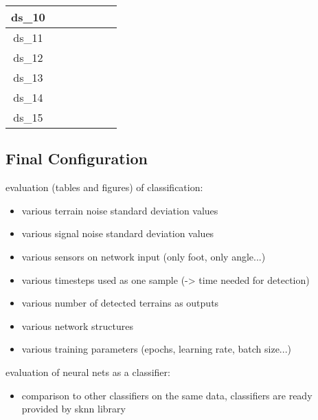 \begin{table}[H]
\begin{tabular}{|c|c|c|c|c|c|c|}
ds\_10                            &                   &                    &                 &                   &                    &                 \\ \hline
ds\_11                            &                   &                    &                 &                   &                    &                 \\ \hline
ds\_12                            &                   &                    &                 &                   &                    &                 \\ \hline
ds\_13                            &                   &                    &                 &                   &                    &                 \\ \hline
ds\_14                            &                   &                    &                 &                   &                    &                 \\ \hline
ds\_15                            &                   &                    &                 &                   &                    &                 \\ \hline
\end{tabular}
\end{table}

\subsection{Final Configuration} \label{ssec:final_configuration}




evaluation (tables and figures) of classification:
\begin{itemize}
\item various terrain noise standard deviation values
\item various signal noise standard deviation values
\item various sensors on network input (only foot, only angle...)
\item various timesteps used as one sample (-> time needed for detection)
\item various number of detected terrains as outputs
\item various network structures
\item various training parameters (epochs, learning rate, batch size...)
\end{itemize}


evaluation of neural nets as a classifier:
\begin{itemize}
\item comparison to other classifiers on the same data, classifiers are ready provided by sknn library
\end{itemize}

